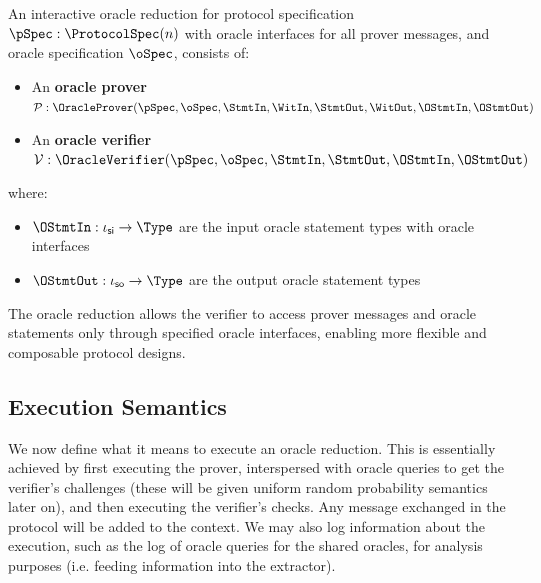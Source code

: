 \begin{definition}
    \label{def:oracle_reduction}
    An interactive oracle reduction for protocol specification $\pSpec : \ProtocolSpec(n)$ with oracle interfaces for all prover messages, and oracle specification $\oSpec$, consists of:
    \begin{itemize}
        \item An \textbf{oracle prover} $\mathcal{P} : \OracleProver(\pSpec, \oSpec, \StmtIn, \WitIn, \StmtOut, \WitOut, \OStmtIn, \OStmtOut)$
        \item An \textbf{oracle verifier} $\mathcal{V} : \OracleVerifier(\pSpec, \oSpec, \StmtIn, \StmtOut, \OStmtIn, \OStmtOut)$
    \end{itemize}

    where:
    \begin{itemize}
        \item $\OStmtIn : \iota_{\mathsf{si}} \to \Type$ are the input oracle statement types with oracle interfaces
        \item $\OStmtOut : \iota_{\mathsf{so}} \to \Type$ are the output oracle statement types
    \end{itemize}

    The oracle reduction allows the verifier to access prover messages and oracle statements only through specified oracle interfaces, enabling more flexible and composable protocol designs.
\end{definition}

\subsection{Execution Semantics}\label{sec:execution_semantics}

We now define what it means to execute an oracle reduction. This is essentially achieved by first
executing the prover, interspersed with oracle queries to get the verifier's challenges (these will
be given uniform random probability semantics later on), and then executing the verifier's checks.
Any message exchanged in the protocol will be added to the context. We may also log information
about the execution, such as the log of oracle queries for the shared oracles, for analysis purposes
(i.e. feeding information into the extractor).

